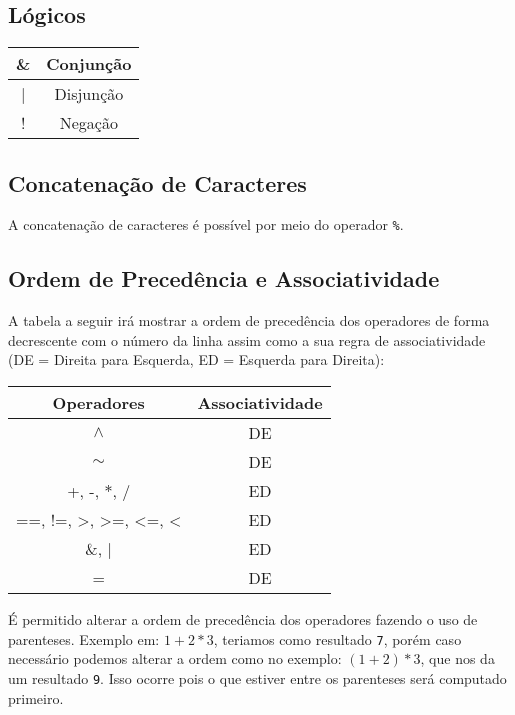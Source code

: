 \documentclass[a4paper,11pt]{article}
\begin{document}
\subsection{Lógicos}
\begin{center}
    \begin{tabular}{|c|c|}
         \hline
         \& & Conjunção\\
         \hline
         | & Disjunção\\
         \hline
         ! & Negação\\
         \hline
    \end{tabular}
\end{center}

\subsection{Concatenação de Caracteres}
A concatenação de caracteres é possível por meio do operador \texttt{\%}.

\subsection{Ordem de Precedência e Associatividade}
A tabela a seguir irá mostrar a ordem de precedência dos operadores de forma decrescente com o
número da linha assim como a sua regra de associatividade (DE = Direita para Esquerda, ED = 
Esquerda para Direita):
\begin{center}
    \begin{tabular}{|c|c|}
         \hline
         \textbf{Operadores} & \textbf{Associatividade}\\
         \hline
         $\wedge$ & DE\\
         \hline
         $\sim$ & DE\\
         \hline
         +, -, $\ast$, / & ED\\
         \hline
         ==, !=, >, >=, <=, < & ED\\
         \hline
         \&, | & ED\\
         \hline
         = & DE\\
         \hline
    \end{tabular}
\end{center}

\hfill

É permitido alterar a ordem de precedência dos operadores fazendo o uso de parenteses.
Exemplo em: $1 + 2 * 3$, teriamos como resultado \texttt{7}, porém caso necessário podemos
alterar a ordem como no exemplo: $(1 + 2) * 3$, que nos da um resultado \texttt{9}. Isso ocorre
pois o que estiver entre os parenteses será computado primeiro.
\end{document}
